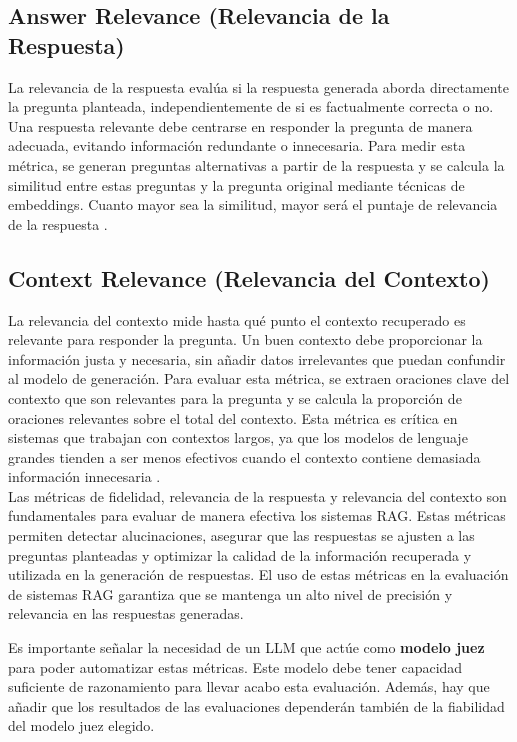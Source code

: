 \subsection{Answer Relevance (Relevancia de la Respuesta)}
La relevancia de la respuesta evalúa si la respuesta generada aborda directamente la pregunta planteada, independientemente de si es factualmente correcta o no. Una respuesta relevante debe centrarse en responder la pregunta de manera adecuada, evitando información redundante o innecesaria. Para medir esta métrica, se generan preguntas alternativas a partir de la respuesta y se calcula la similitud entre estas preguntas y la pregunta original mediante técnicas de embeddings. Cuanto mayor sea la similitud, mayor será el puntaje de relevancia de la respuesta \citep{ragas2023}.

\subsection{Context Relevance (Relevancia del Contexto)}
La relevancia del contexto mide hasta qué punto el contexto recuperado es relevante para responder la pregunta. Un buen contexto debe proporcionar la información justa y necesaria, sin añadir datos irrelevantes que puedan confundir al modelo de generación. Para evaluar esta métrica, se extraen oraciones clave del contexto que son relevantes para la pregunta y se calcula la proporción de oraciones relevantes sobre el total del contexto. Esta métrica es crítica en sistemas que trabajan con contextos largos, ya que los modelos de lenguaje grandes tienden a ser menos efectivos cuando el contexto contiene demasiada información innecesaria \citep{ragas2023}.\\

Las métricas de fidelidad, relevancia de la respuesta y relevancia del contexto son fundamentales para evaluar de manera efectiva los sistemas RAG. Estas métricas permiten detectar alucinaciones, asegurar que las respuestas se ajusten a las preguntas planteadas y optimizar la calidad de la información recuperada y utilizada en la generación de respuestas. El uso de estas métricas en la evaluación de sistemas RAG garantiza que se mantenga un alto nivel de precisión y relevancia en las respuestas generadas.

Es importante señalar la necesidad de un LLM que actúe como \textbf{modelo juez} para poder automatizar estas métricas. Este modelo debe tener capacidad suficiente de razonamiento para llevar acabo esta evaluación. Además, hay que añadir que los resultados de las evaluaciones dependerán también de la fiabilidad del modelo juez elegido.

